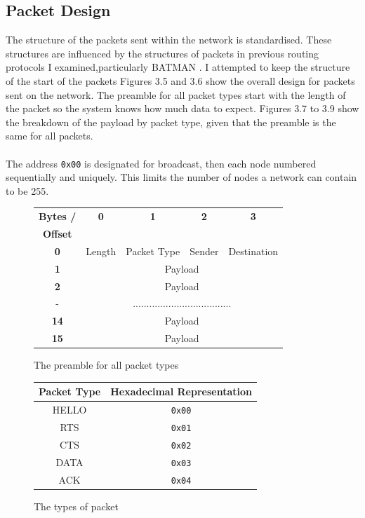 \documentclass[12pt,a4paper]{report}
\begin{document}
\subsection{Packet Design}
The structure of the packets sent within the network is standardised. These structures are influenced by the structures of packets in previous routing protocols I examined,particularly BATMAN \cite{batman}. I attempted to keep the structure of the start of the packets  Figures 3.5 and 3.6 show the overall design for packets sent on the network. The preamble for all packet types start with the length of the packet so the system knows how much data to expect. Figures 3.7 to 3.9 show the breakdown of the payload by packet type, given that the preamble is the same for all packets.  \\ \\
The address \verb'0x00' is designated for broadcast, then each node numbered sequentially and uniquely. This limits the number of nodes a network can contain to be 255.
\begin{figure}[h]
\begin{center}
\begin{tabular}{ |c|c|c|c|c| } 
\hline
\textbf{Bytes /} & \textbf{0} & \textbf{1} & \textbf{2} & \textbf{3} \\ 
\textbf{Offset} &  &  &  &  \\ 
\hline
\textbf{0} & Length & Packet Type & Sender & Destination \\ 
\hline
\textbf{1} &     \multicolumn{4}{c|}{Payload}  \\ 
\hline
\textbf{2} &     \multicolumn{4}{c|}{Payload}  \\
\hline
 - & \multicolumn{4}{c|}{....................................}  \\
\hline
\textbf{14} & \multicolumn{4}{c|}{Payload}  \\
\hline
\textbf{15} & \multicolumn{4}{c|}{Payload}  \\
\hline
\end{tabular}
\end{center}
\caption{The preamble for all packet types}
\end{figure}

\begin{figure}[h]
\begin{center}
\begin{tabular}{ |c|c| } 
\hline
\textbf{Packet Type} &  \textbf{Hexadecimal Representation} \\
\hline
HELLO & \verb'0x00' \\ 
\hline
RTS &  \verb'0x01'  \\ 
\hline
CTS &   \verb'0x02'  \\
\hline
DATA &  \verb'0x03' \\
\hline
ACK &  \verb'0x04' \\
\hline
\end{tabular}
\end{center}
\caption{The types of packet}
\end{figure}
\end{document}
